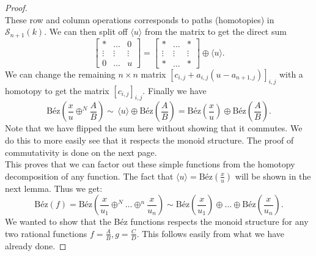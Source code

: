 \begin{lemma}
\begin{proof}
\begin{equation*}
%
\end{equation*}
%
These row and column operations corresponds to paths (homotopies) in \(\mathcal{S}_{n+1}(k)\). We can then split off \(\langle u \rangle \) from the matrix to get the direct sum
%
\begin{equation*}
    \begin{bmatrix}
        * & \dots & 0 \\
        \vdots & \vdots & \vdots \\
        0 & \dots & u
    \end{bmatrix} 
=
    \begin{bmatrix}
    * & \dots & * \\
    \vdots & \vdots & \vdots \\
    * & \dots & *
\end{bmatrix} 
%
\oplus \langle u \rangle .
%
\end{equation*}
We can change the remaining \(n\times n\) matrix \([c_{i,j}+a_{i,j}(u-a_{n+1,j})]_{i,j}\) with a homotopy to get the matrix \([c_{i,j}]_{i,j}\). Finally we have 
%
\begin{equation}
%
    \text{Béz}(\frac{x}{u}\oplus^{N}\frac{A}{B}) \sim 
    \, \langle u \rangle \oplus \text{Béz}(\frac{A}{B}) =
    \text{Béz}(\frac{x}{u})\oplus \text{Béz}(\frac{A}{B}).
%
\end{equation}
%
Note that we have flipped the sum here without showing that it commutes. We do this to more easily see that it respects the monoid structure. The proof of commutativity is done on the next page. \\
This proves that we can factor out these simple functions from the homotopy decomposition of any function. The fact that \(\langle u \rangle =\text{Béz}(\frac{x}{u})\) will be shown in the next lemma. Thus we get:
\begin{equation}\label{Eq:Bezout decomposition}
%
    \text{Béz}(f)=\text{Béz}(\frac{x}{u_1}\oplus^N \dots \oplus^n \frac{x}{u_n}) \sim \text{Béz}(\frac{x}{u_1})\oplus \dots \oplus \text{Béz}(\frac{x}{u_n}) .
%
\end{equation}
%
We wanted to show that the Béz functions respects the monoid structure for any two rational functions \(f=\frac{A}{B}, g = \frac{C}{D}\). This follows easily from what we have already done. 


\end{proof}
\end{lemma}
